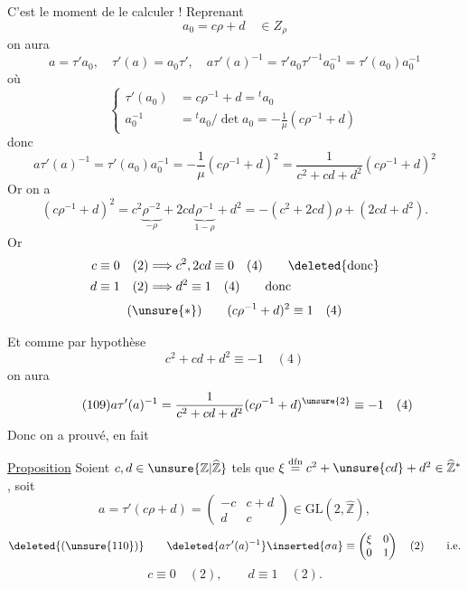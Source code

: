 
C'est le moment de le calculer ! Reprenant
\[
a_0=c\rho+d\quad\in Z_\rho
\]
on aura
\[
a=\tau'a_0,\quad \tau'(a)=a_0\tau',\quad
a\tau'(a)^{-1}=\tau'a_0\tau'^{-1}a_0^{-1}=\tau'(a_0)a_0^{-1}
\]
où
\[
\left\{\begin{aligned}
\tau'(a_0)&=c\rho^{-1}+d={}^{t}a_0\\
a_0^{-1}&={}^{t}a_0/\det a_0=-\frac1\mu(c\rho^{-1}+d)
\end{aligned}\right.
\]
donc
\[
a\tau'(a)^{-1}=\tau'(a_0)a_0^{-1}
=-\frac1\mu(c\rho^{-1}+d)^2
=\frac1{c^2+cd+d^2}(c\rho^{-1}+d)^2
\]
Or on a
\[
(c\rho^{-1}+d)^2
=c^2\underbrace{\rho^{-2}}_{-\rho}
+2cd\underbrace{\rho^{-1}}_{1-\rho}+d^2
=-(c^2+2cd)\rho+(2cd+d^2).
\]
Or 
\[
\begin{aligned}
c\equiv0\quad(2)&\Longrightarrow c^2,2cd\equiv0\quad(4)
\qquad\text{\deleted{donc}}\\
d\equiv1\quad(2)&\Longrightarrow d^2\equiv1\quad(4)
\qquad\text{donc}
\end{aligned}
\]
\[
(\unsure{*})\qquad (c\rho^{-1}+d)^2\equiv1\quad(4)
\]


Et comme par hypothèse
\[
c^2+cd+d^2\equiv-1\quad(4)
\]
on aura
\[
\tag{109}
a\tau'(a)^{-1}=\frac1{c^2+cd+d^2}(c\rho^{-1}+d)^{\unsure{2}}
\equiv-1\quad(4)
\]
Donc on a prouvé, en fait

\uline{Proposition} Soient $c,d\in\unsure{\mathbb Z|\widehat{\mathbb Z}}$
tels que $\xi\overset{\mathrm{dfn}}{=}c^2+\unsure{cd}+d^2
\in\widehat{\mathbb Z}^{*}$, soit
\[
a=\tau'(c\rho+d)=\begin{pmatrix}-c&c+d\\d&c\end{pmatrix}
\in\mathrm{GL}(2,\widehat{\mathbb Z}),
\]
\[
\deleted{(\unsure{110})}\qquad
\deleted{a\tau'(a)^{-1}}\inserted{\sigma a}
\equiv\begin{pmatrix}\xi&0\\0&1\end{pmatrix}
\quad(2)\qquad\text{i.e.}
\]
\[
c\equiv0\quad(2),\qquad d\equiv1\quad(2).
\]

